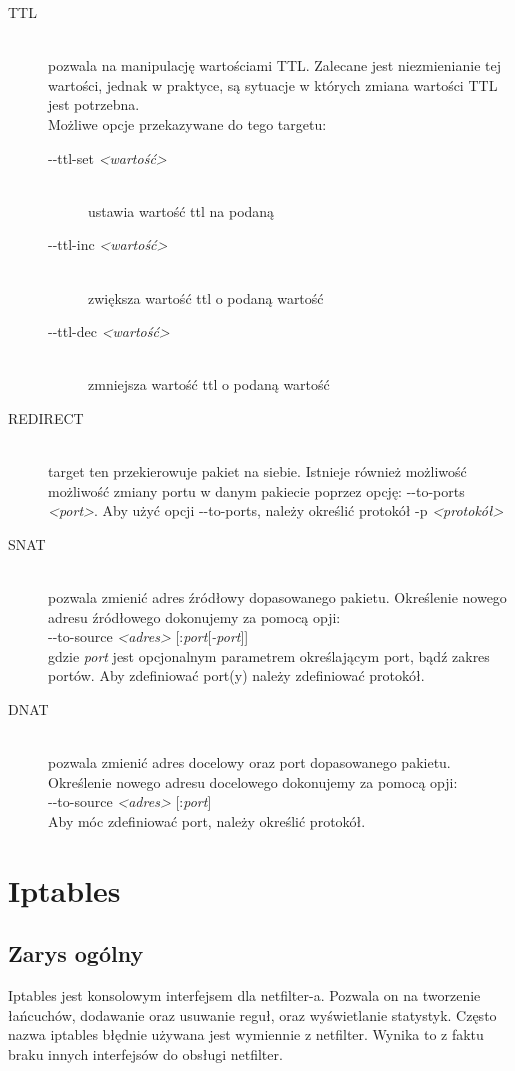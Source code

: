 \documentclass[a4paper,12pt]{book}
\newcommand{\param}[1]{\textit{\textless #1\textgreater}}
\begin{document}
\begin{description}
				\item[TTL] \hfill \\
					pozwala na manipulację wartościami TTL. Zalecane jest niezmienianie tej wartości, jednak w praktyce, są sytuacje w których zmiana wartości TTL jest potrzebna.\\
					Możliwe opcje przekazywane do tego targetu:
					\begin{description}
						\item[-{}-ttl-set \param{wartość}] \hfill \\
							ustawia wartość ttl na podaną
						\item[-{}-ttl-inc \param{wartość}] \hfill \\
							zwiększa wartość ttl o podaną wartość
						\item[-{}-ttl-dec \param{wartość}] \hfill \\
							zmniejsza wartość ttl o podaną wartość
					\end{description}
				\item[REDIRECT] \hfill \\
					target ten przekierowuje pakiet na siebie. Istnieje również możliwość możliwość zmiany portu w danym pakiecie poprzez opcję: -{}-to-ports \param{port}.
					Aby użyć opcji -{}-to-ports, należy określić protokół -p \param{protokół}
				\item[SNAT] \hfill \\
					pozwala zmienić adres źródłowy dopasowanego pakietu. Określenie nowego adresu źródłowego dokonujemy za pomocą opji:\\
					-{}-to-source \param{adres} [:\textit{port}[\textit{-port}]]\\
					gdzie \textit{port} jest opcjonalnym parametrem określającym port, bądź zakres portów. Aby zdefiniować port(y) należy zdefiniować protokół.
				\item[DNAT] \hfill \\
					pozwala zmienić adres docelowy oraz port dopasowanego pakietu. Określenie nowego adresu docelowego dokonujemy za pomocą opji:\\
					-{}-to-source \param{adres} [:\textit{port}]\\
					Aby móc zdefiniować port, należy określić protokół.
			\end{description}
\chapter{Iptables}
	\section{Zarys ogólny}
		Iptables jest konsolowym interfejsem dla netfilter-a. Pozwala on na tworzenie łańcuchów, dodawanie oraz usuwanie reguł, oraz wyświetlanie statystyk.
		Często nazwa iptables błędnie używana jest wymiennie z netfilter. Wynika to z faktu braku innych interfejsów do obsługi netfilter.
\end{document}
